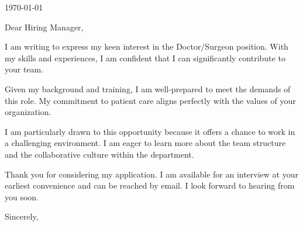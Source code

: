 \documentclass[letterpaper,11pt]{article}
\begin{document}
\today

Dear Hiring Manager,

I am writing to express my keen interest in the Doctor/Surgeon position. With my skills and experiences, I am confident that I can significantly contribute to your team.

Given my background and training, I am well-prepared to meet the demands of this role. My commitment to patient care aligns perfectly with the values of your organization.

I am particularly drawn to this opportunity because it offers a chance to work in a challenging environment. I am eager to learn more about the team structure and the collaborative culture within the department.

Thank you for considering my application. I am available for an interview at your earliest convenience and can be reached by email. I look forward to hearing from you soon.

Sincerely,
\end{document}
